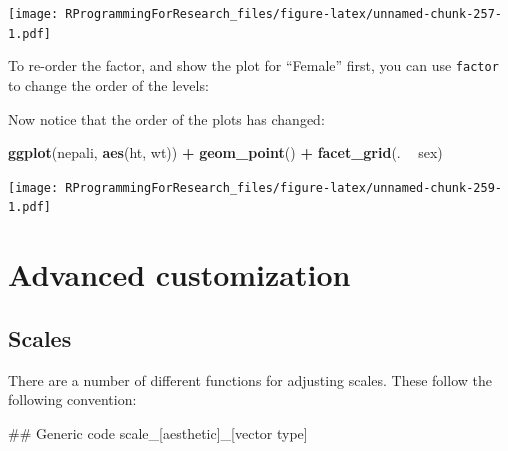 \documentclass[]{book}
\makeatletter
\newenvironment{Shaded}{\begin{snugshade}}{\end{snugshade}}
\newcommand{\KeywordTok}[1]{\textcolor[rgb]{0.13,0.29,0.53}{\textbf{#1}}}
\newcommand{\DataTypeTok}[1]{\textcolor[rgb]{0.13,0.29,0.53}{#1}}
\newcommand{\StringTok}[1]{\textcolor[rgb]{0.31,0.60,0.02}{#1}}
\newcommand{\OperatorTok}[1]{\textcolor[rgb]{0.81,0.36,0.00}{\textbf{#1}}}
\newcommand{\NormalTok}[1]{#1}
\newenvironment{kframe}{%
\medskip{}
\setlength{\fboxsep}{.8em}
 \def\at@end@of@kframe{}%
 \ifinner\ifhmode%
  \def\at@end@of@kframe{\end{minipage}}%
  \begin{minipage}{\columnwidth}%
 \fi\fi%
 \def\FrameCommand##1{\hskip\@totalleftmargin \hskip-\fboxsep
 \colorbox{shadecolor}{##1}\hskip-\fboxsep
     \hskip-\linewidth \hskip-\@totalleftmargin \hskip\columnwidth}%
 \MakeFramed {\advance\hsize-\width
   \@totalleftmargin\z@ \linewidth\hsize
   \@setminipage}}%
 {\par\unskip\endMakeFramed%
 \at@end@of@kframe}
\renewenvironment{Shaded}{\begin{kframe}}{\end{kframe}}
\theoremstyle{definition}
\theoremstyle{definition}
\theoremstyle{definition}
\theoremstyle{remark}
\makeatother
\begin{document}
\texttt{[image: RProgrammingForResearch\_files/figure-latex/unnamed-chunk-257-1.pdf]}

To re-order the factor, and show the plot for ``Female'' first, you can
use \texttt{factor} to change the order of the levels:

\begin{Shaded}
\end{Shaded}

Now notice that the order of the plots has changed:

\begin{Shaded}
\begin{Highlighting}[]
\KeywordTok{ggplot}\NormalTok{(nepali, }\KeywordTok{aes}\NormalTok{(ht, wt)) }\OperatorTok{+}\StringTok{ }
\StringTok{        }\KeywordTok{geom_point}\NormalTok{() }\OperatorTok{+}\StringTok{ }
\StringTok{        }\KeywordTok{facet_grid}\NormalTok{(. }\OperatorTok{~}\StringTok{ }\NormalTok{sex)}
\end{Highlighting}
\end{Shaded}

\texttt{[image: RProgrammingForResearch\_files/figure-latex/unnamed-chunk-259-1.pdf]}

\section{Advanced customization}\label{advanced-customization}

\subsection{Scales}\label{scales}

There are a number of different functions for adjusting scales. These
follow the following convention:

\begin{Shaded}
\begin{Highlighting}[]
\NormalTok{## Generic code}
\NormalTok{scale_[aesthetic]_[vector type]}
\end{Highlighting}
\end{Shaded}
\end{document}
